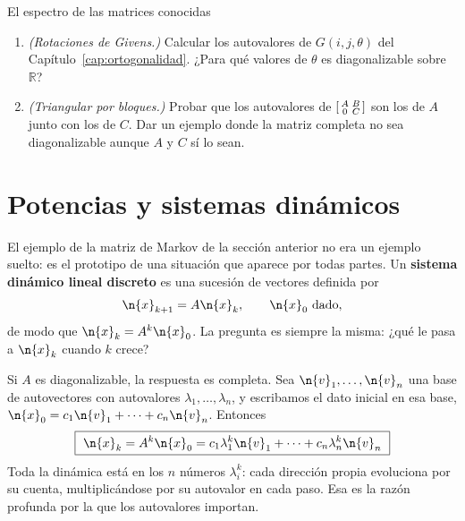 \begin{entrega}{El espectro de las matrices conocidas}
\begin{enumerate}[label=\textbf{(\alph*)},itemsep=3pt,topsep=4pt]
\item \emph{(Rotaciones de Givens.)} Calcular los autovalores de $G(i,j,\theta)$ del
Capítulo~\ref{cap:ortogonalidad}. ¿Para qué valores de $\theta$ es diagonalizable sobre
$\mathbb{R}$?

\item \emph{(Triangular por bloques.)} Probar que los autovalores de
$\begin{bsmallmatrix}A&B\\0&C\end{bsmallmatrix}$ son los de $A$ junto con los de $C$.
Dar un ejemplo donde la matriz completa no sea diagonalizable aunque $A$ y $C$ sí lo
sean.
\end{enumerate}

\medskip
{}
\end{entrega}

\section{Potencias y sistemas dinámicos}
\label{sec:dinamica}

El ejemplo de la matriz de Markov de la sección anterior no era un ejemplo suelto: es el
prototipo de una situación que aparece por todas partes. Un \textbf{sistema dinámico
lineal discreto} es una sucesión de vectores definida por
\[
\n{x}_{k+1}=A\n{x}_k ,\qquad \n{x}_0 \ \text{dado},
\]
de modo que $\n{x}_k=A^k\n{x}_0$. La pregunta es siempre la misma: ¿qué le pasa a
$\n{x}_k$ cuando $k$ crece?

Si $A$ es diagonalizable, la respuesta es completa. Sea $\n{v}_1,\dots,\n{v}_n$ una base
de autovectores con autovalores $\lambda_1,\dots,\lambda_n$, y escribamos el dato
inicial en esa base, $\n{x}_0=c_1\n{v}_1+\cdots+c_n\n{v}_n$. Entonces
\begin{equation}\label{eq:dinamica}
\boxed{\ \n{x}_k=A^k\n{x}_0=c_1\lambda_1^{k}\n{v}_1+\cdots+c_n\lambda_n^{k}\n{v}_n\ }
\end{equation}
Toda la dinámica está en los $n$ números $\lambda_i^k$: cada dirección propia evoluciona
por su cuenta, multiplicándose por su autovalor en cada paso. Esa es la razón profunda
por la que los autovalores importan.

